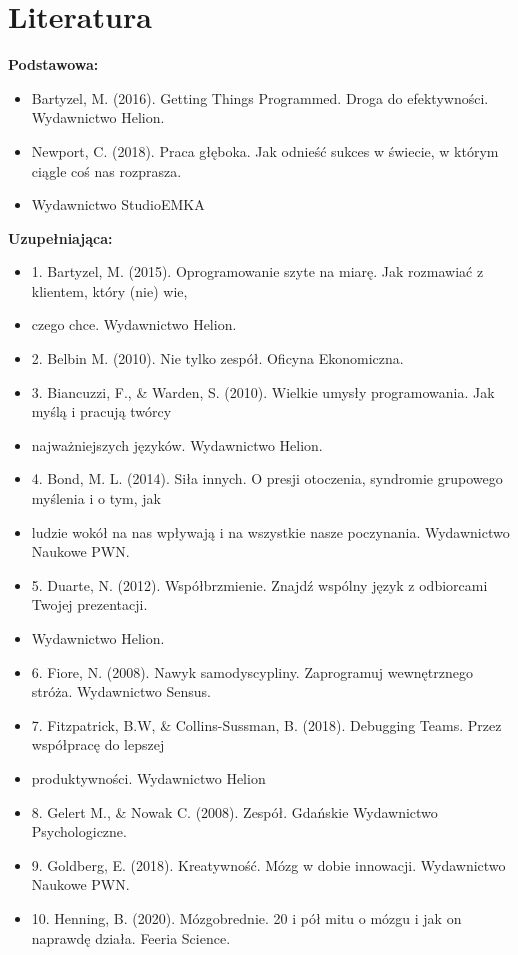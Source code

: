 \documentclass[12pt, a4paper]{article}
\begin{document}
\section{Literatura}

\textbf{Podstawowa:}
\begin{itemize}
  \item Bartyzel, M. (2016). Getting Things Programmed. Droga do efektywności. Wydawnictwo Helion.
  \item Newport, C. (2018). Praca głęboka. Jak odnieść sukces w świecie, w którym ciągle coś nas rozprasza.
  \item Wydawnictwo StudioEMKA
\end{itemize}

\textbf{Uzupełniająca:}
\begin{itemize}
  \item 1. Bartyzel, M. (2015). Oprogramowanie szyte na miarę. Jak rozmawiać z klientem, który (nie) wie,
  \item czego chce. Wydawnictwo Helion.
  \item 2. Belbin M. (2010). Nie tylko zespół. Oficyna Ekonomiczna.
  \item 3. Biancuzzi, F., \& Warden, S. (2010). Wielkie umysły programowania. Jak myślą i pracują twórcy
  \item najważniejszych języków. Wydawnictwo Helion.
  \item 4. Bond, M. L. (2014). Siła innych. O presji otoczenia, syndromie grupowego myślenia i o tym, jak
  \item ludzie wokół na nas wpływają i na wszystkie nasze poczynania. Wydawnictwo Naukowe PWN.
  \item 5. Duarte, N. (2012). Współbrzmienie. Znajdź wspólny język z odbiorcami Twojej prezentacji.
  \item Wydawnictwo Helion.
  \item 6. Fiore, N. (2008). Nawyk samodyscypliny. Zaprogramuj wewnętrznego stróża. Wydawnictwo Sensus.
  \item 7. Fitzpatrick, B.W, \& Collins-Sussman, B. (2018). Debugging Teams. Przez współpracę do lepszej
  \item produktywności. Wydawnictwo Helion
  \item 8. Gelert M., \& Nowak C. (2008). Zespół. Gdańskie Wydawnictwo Psychologiczne.
  \item 9. Goldberg, E. (2018). Kreatywność. Mózg w dobie innowacji. Wydawnictwo Naukowe PWN.
  \item 10. Henning, B. (2020). Mózgobrednie. 20 i pół mitu o mózgu i jak on naprawdę działa. Feeria Science.

\end{itemize}
\end{document}
